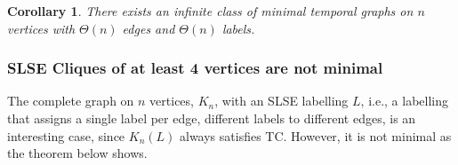 \documentclass[a4paper,UKenglish]{article}
\newtheorem{corollary}{Corollary}
\begin{document}
\begin{corollary}
There exists an infinite class of minimal temporal graphs on $n$ vertices with $\Theta(n)$ edges and $\Theta(n)$ labels.
\end{corollary}








\subsubsection{SLSE Cliques of at least 4 vertices are not minimal}\label{sec:clique_minimal}

The complete graph on $n$ vertices, $K_n$, with an SLSE labelling $L$, i.e., a labelling that assigns a single label per edge, different labels to different edges, is an interesting case, since $K_n(L)$ always satisfies TC. However, it is not minimal as the theorem below shows.
\end{document}
